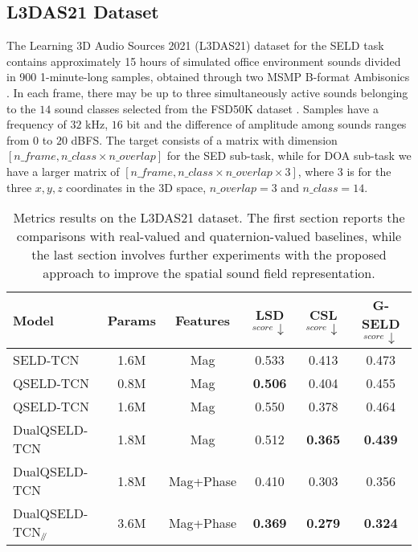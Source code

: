 \documentclass[3p, preprint, twocolumn]{elsarticle}
\newcommand{\parallelsum}{\mathbin{\!/\mkern-5mu/\!}}
\begin{document}
\subsection{L3DAS21 Dataset}
The Learning $3$D Audio Sources 2021 (L3DAS21) dataset for the SELD task contains approximately 15 hours of simulated office environment sounds divided in 900 1-minute-long samples, obtained through two MSMP B-format Ambisonics \cite{guizzo2021l3das21}. In each frame, there may be up to three simultaneously active sounds belonging to the $14$ sound classes selected from the FSD50K dataset \cite{Fonseca2022FSD50KAO}. Samples have a frequency of $32$ kHz, $16$ bit and the difference of amplitude among sounds ranges from $0$ to $20$ dBFS. The target consists of a matrix with dimension $[n\_frame, n\_class \times n\_overlap]$ for the SED sub-task, while for DOA sub-task we have a larger matrix of $[n\_frame, n\_class \times n\_overlap \times 3]$, where $3$ is for the three $x,y,z$ coordinates in the $3$D space, $n\_overlap=3$ and $n\_class=14$.

\begin{table*}[]
\caption{Metrics results on the L3DAS21 dataset. The first section reports the comparisons with real-valued and quaternion-valued baselines, while the last section involves further experiments with the proposed approach to improve the spatial sound field representation.}
\label{tab:metrics2}
\centering
\begin{tabular}{l|cc|ccc}
\toprule
Model & Params & Features & LSD$_{score}\downarrow$ & CSL$_{score}\downarrow$ & G-SELD$_{score}\downarrow$ \\\hline 
SELD-TCN & 1.6M & Mag & 0.533 & 0.413 & 0.473 \\ QSELD-TCN & 0.8M & Mag & \textbf{0.506} & 0.404 & 0.455 \\ QSELD-TCN & 1.6M & Mag & 0.550 & 0.378 & 0.464 \\ DualQSELD-TCN & 1.8M & Mag & 0.512 & \textbf{0.365} &  \textbf{0.439} \\ \hline
DualQSELD-TCN & 1.8M & Mag+Phase &  0.410 & 0.303 & 0.356 \\ DualQSELD-TCN$_{\parallelsum}$ & 3.6M & Mag+Phase &  \textbf{0.369} & \textbf{0.279} & \textbf{0.324} \\ \bottomrule
\end{tabular}
\end{table*}
\end{document}
